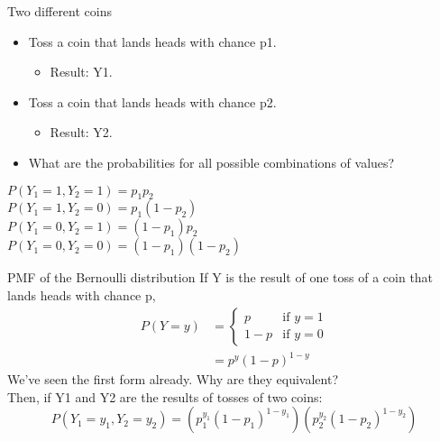 \documentclass[aspectratio=169]{../latex_main/tntbeamer}  %
\begin{document}
	\begin{frame}{Two different coins}
	   \begin{itemize}
	       \item Toss a coin that lands heads with chance p1.
	       \begin{itemize}
	           \item Result: Y1.
	       \end{itemize}
	       \item Toss a coin that lands heads with chance p2.
	       \begin{itemize}
	           \item Result: Y2.
	       \end{itemize}
	       \item What are the probabilities for all possible combinations of values?
	   \end{itemize}
	   
	   $P(Y_1 = 1,Y_2 = 1) = p_1p_2$\\
	   $P(Y_1 = 1,Y_2 = 0) = p_1(1-p_2)$\\
	   $P(Y_1 = 0,Y_2 = 1) = (1 - p_1)p_2$\\
	   $P(Y_1 = 0,Y_2 = 0) = (1 - p_1)(1 - p_2)$
	\end{frame}
	
	
	\begin{frame}{PMF of the Bernoulli distribution}
	   If Y is the result of one toss of a coin that lands heads with chance p,
	   \begin{align*}
	       P(Y = y) & = \left\{\begin{array}{cc}
	           p & \text{if } y = 1 \\
	          1-p   & \text{if } y = 0
	       \end{array}\right.\\
	       &= p^y(1-p)^{1-y}
	   \end{align*}
	   We’ve seen the first form already. Why are they equivalent?\\
	   Then, if Y1 and Y2 are the results of tosses of two coins:
	   \begin{equation*}
	       P(Y_1 = y_1, Y_2 = y_2) = (p_1^{y_1}(1- p_1)^{1-y_1})(p_2^{y_2}(1 - p_2)^{1 -y_2})
	   \end{equation*}
	   
	\end{frame}
	
\end{document}
